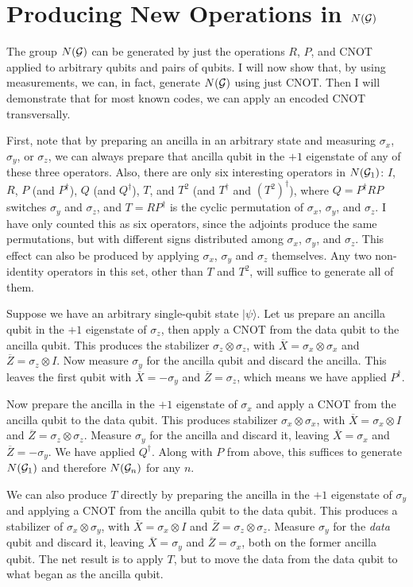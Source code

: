 \documentclass{report}
\newcommand{\G}{{\cal G}}
\newcommand{\ket}[1]{|{#1}\rangle}
\newcommand{\X}{\sigma_x}
\newcommand{\Z}{\sigma_z}
\newcommand{\Y}{\sigma_y}
\newcommand{\Xbar}{\overline{X}}
\newcommand{\Zbar}{\overline{Z}}
\begin{document}
\section{Producing New Operations in $N(\G)$}
\label{sec-4qubit}

The group $N(\G)$ can be generated by just the operations $R$, $P$, and 
CNOT applied to arbitrary qubits and pairs of qubits.  I will now show that, 
by using measurements, we can, in fact, generate $N(\G)$ using just CNOT.  
Then I will demonstrate that for most known codes, we can apply an 
encoded CNOT transversally.

First, note that by preparing an ancilla in an arbitrary state and measuring 
$\X$, $\Y$, or $\Z$, we can always prepare that ancilla qubit in the $+1$ 
eigenstate of any of these three operators.  Also, there are only six 
interesting operators in $N(\G_1)$: $I$, $R$, $P$ (and $P^\dagger$), $Q$ (and 
$Q^\dagger$), $T$, and $T^2$ (and $T^\dagger$ and $(T^2)^\dagger$), where 
$Q = P^\dagger RP$ switches $\Y$ and $\Z$, and $T = RP^\dagger$ is the cyclic 
permutation of $\X$, $\Y$, and $\Z$.  I have only counted this as six 
operators, since the adjoints produce the same permutations, but with 
different signs distributed among $\X$, $\Y$, and $\Z$.  This effect can also 
be produced by applying $\X$, $\Y$ and $\Z$ themselves.  Any two 
non-identity operators in this set, other than $T$ and $T^2$, will suffice to 
generate all of them.

Suppose we have an arbitrary single-qubit state $\ket{\psi}$.  Let us 
prepare an ancilla qubit in the $+1$ eigenstate of $\Z$, then apply a CNOT 
from the data qubit to the ancilla qubit.  This produces the stabilizer $\Z 
\otimes \Z$, with $\Xbar = \X \otimes \X$ and $\Zbar = \Z \otimes I$.  
Now measure $\Y$ for the ancilla qubit and discard the ancilla.  This leaves 
the first qubit with $\Xbar = -\Y$ and $\Zbar = \Z$, which means we have 
applied $P^\dagger$.

Now prepare the ancilla in the $+1$ eigenstate of $\X$ and apply a CNOT 
from the ancilla qubit to the data qubit.  This produces stabilizer $\X 
\otimes \X$, with $\Xbar = \X \otimes I$ and $\Zbar = \Z \otimes \Z$.  
Measure $\Y$ for the ancilla and discard it, leaving $\Xbar = \X$ and 
$\Zbar = -\Y$.  We have applied $Q^\dagger$.  Along with $P$ from above, this 
suffices to generate $N(\G_1)$ and therefore $N(\G_n)$ for any $n$.

We can also produce $T$ directly by preparing the ancilla in the $+1$ 
eigenstate of $\Y$ and applying a CNOT from the ancilla qubit to the data 
qubit.  This produces a stabilizer of $\X \otimes \Y$, with $\Xbar = \X 
\otimes I$ and $\Zbar = \Z \otimes \Z$.  Measure $\Y$ for the {\em data} 
qubit and discard it, leaving $\Xbar = \Y$ and $\Zbar = \X$, both on the 
former ancilla qubit.   The net result is to apply $T$, but to move the 
data from the data qubit to what began as the ancilla qubit.
\end{document}
